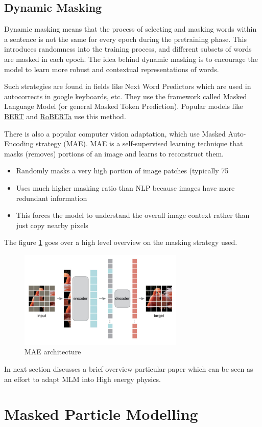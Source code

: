 \documentclass[letterpaper,12pt]{article}
\begin{document}
\begin{spacing}{1.125}
\subsection{Dynamic Masking}

Dynamic masking means that the process of selecting and masking words within a sentence is not the same for every epoch during the pretraining phase. This introduces randomness into the training process, and different subsets of words are masked in each epoch. The idea behind dynamic masking is to encourage the model to learn more robust and contextual representations of words.

Such strategies are found in fields like Next Word Predictors which are used in
autocorrects in google keyboards, etc. They use the framework called Masked
Language Model (or general Masked Token Prediction). Popular models like
\href{https://arxiv.org/abs/1810.04805}{BERT}
and \href{https://arxiv.org/abs/1907.11692}{RoBERTa} use this method.

There is also a popular computer vision adaptation, which use Masked
Auto-Encoding strategy (MAE).
MAE is a self-supervised learning technique that masks (removes) portions of an
image and
learns to reconstruct them.

\begin{itemize}
  \item Randomly masks a very high portion of image patches
(typically 75%
\item Uses much higher masking ratio than NLP because
images have more redundant information
\item This forces the model to understand the overall image
context rather than just copy nearby pixels
\end{itemize}

The figure \ref{mae} goes over a high level overview on the masking strategy
used.


\begin{figure}[!htb]
  \includegraphics[width=0.7\textwidth]{mae.jpeg}
  \caption{MAE architecture}
  \label{mae}
\end{figure}

In next section discusses a brief overview particular paper which can be seen as
an effort to adapt MLM into High energy physics.

\pagebreak
\section{Masked Particle Modelling}


\end{spacing}
\end{document}
